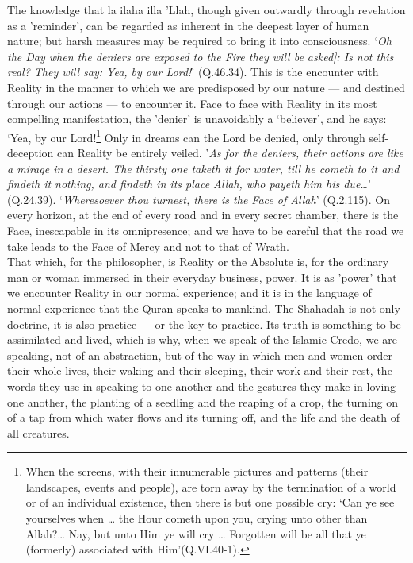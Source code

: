 \documentclass[10pt, twoside]{book}
\begin{document}
The knowledge that la ilaha illa 'Llah, though given outwardly through revelation as a 'reminder', 
can be regarded as inherent in the deepest layer of human nature; but harsh measures may be required 
to bring it into consciousness. `\emph{Oh the Day when the deniers are exposed to the Fire they will be 
asked]: Is not this real? They will say: Yea, by our Lord!}' (Q.46.34). This is the encounter with 
Reality in the manner to which we are predisposed by our nature --- and destined through our actions --- 
to encounter it. Face to face with Reality in its most compelling manifestation, the 'denier' is 
unavoidably a `believer', and he says: `Yea, by our Lord!\footnote{When the screens, with their innumerable pictures and patterns (their landscapes, events and people), are torn away by the termination of a world or of an individual existence, then there is but one possible cry: `Can ye see yourselves when \ldots{} the Hour cometh upon you, crying unto other than Allah?\ldots{} Nay, but unto Him ye will cry \ldots{} Forgotten will be all that ye (formerly) associated with Him'(Q.VI.40-1).} Only in dreams can the Lord be denied, only through self\hyp{}deception can Reality be entirely veiled. '\emph{As for the deniers, their actions are like a mirage in a desert. The thirsty one taketh it for water, till he cometh to it and findeth it nothing, and findeth in its place Allah, who payeth him his due\ldots{}}' (Q.24.39). `\emph{Wheresoever thou turnest, there is the Face of Allah}' (Q.2.115). On every horizon, at the end of every road and in every secret chamber, there is the Face, inescapable in its omnipresence; and we have to be careful that the road we take leads to the Face of Mercy and not to that of Wrath. \\

That which, for the philosopher, is Reality or the Absolute is, for the ordinary man or woman 
immersed in their everyday business, power. It is as 'power' that we encounter Reality in our normal 
experience; and it is in the language of normal experience that the Quran speaks to mankind. The 
Shahadah is not only doctrine, it is also practice --- or the key to practice. Its truth is something 
to be assimilated and lived, which is why, when we speak of the Islamic Credo, we are speaking, not 
of an abstraction, but of the way in which men and women order their whole lives, their waking and 
their sleeping, their work and their rest, the words they use in speaking to one another and the 
gestures they make in loving one another, the planting of a seedling and the reaping of a crop, the 
turning on of a tap from which water flows and its turning off, and the life and the death of all 
creatures. \\
\end{document}
